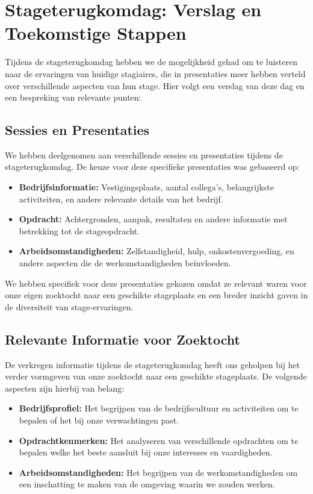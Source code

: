 \section{Stageterugkomdag: Verslag en Toekomstige Stappen}

Tijdens de stageterugkomdag hebben we de mogelijkheid gehad om te luisteren naar de ervaringen van huidige stagiaires, die in presentaties meer hebben verteld over verschillende aspecten van hun stage. Hier volgt een verslag van deze dag en een bespreking van relevante punten:

\subsection{Sessies en Presentaties}

We hebben deelgenomen aan verschillende sessies en presentaties tijdens de stageterugkomdag. De keuze voor deze specifieke presentaties was gebaseerd op:

\begin{itemize}
    \item \textbf{Bedrijfsinformatie:} Vestigingsplaats, aantal collega's, belangrijkste activiteiten, en andere relevante details van het bedrijf.
    \item \textbf{Opdracht:} Achtergronden, aanpak, resultaten en andere informatie met betrekking tot de stageopdracht.
    \item \textbf{Arbeidsomstandigheden:} Zelfstandigheid, hulp, onkostenvergoeding, en andere aspecten die de werkomstandigheden beïnvloeden.
\end{itemize}

We hebben specifiek voor deze presentaties gekozen omdat ze relevant waren voor onze eigen zoektocht naar een geschikte stageplaats en een breder inzicht gaven in de diversiteit van stage-ervaringen.

\subsection{Relevante Informatie voor Zoektocht}

De verkregen informatie tijdens de stageterugkomdag heeft ons geholpen bij het verder vormgeven van onze zoektocht naar een geschikte stageplaats. De volgende aspecten zijn hierbij van belang:

\begin{itemize}
    \item \textbf{Bedrijfsprofiel:} Het begrijpen van de bedrijfscultuur en activiteiten om te bepalen of het bij onze verwachtingen past.
    \item \textbf{Opdrachtkenmerken:} Het analyseren van verschillende opdrachten om te bepalen welke het beste aansluit bij onze interesses en vaardigheden.
    \item \textbf{Arbeidsomstandigheden:} Het begrijpen van de werkomstandigheden om een inschatting te maken van de omgeving waarin we zouden werken.
\end{itemize}

